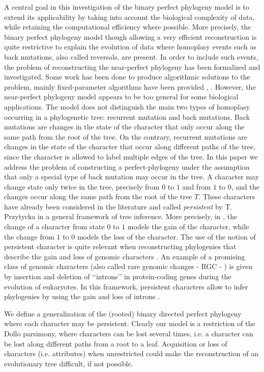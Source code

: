 \documentclass{llncs}
\begin{document}
A central goal in this investigation  of the binary perfect phylogeny model is to extend its applicability by taking into account the biological complexity of  data, while retaining  the computational efficiency where possible. More precisely, the binary perfect phylogeny model though allowing a very efficient reconstruction is quite restrictive to explain the evolution of data where   homoplasy events such as back mutations, also called reversals,  are present.  In order to include such events,   the problem of reconstructing the near-perfect phylogeny    has been formalized and investigated.  Some work has been done to produce algorithmic  solutions to the problem, mainly fixed-parameter algorithms have been provided \cite{near-perfect2}, \cite{near-perfect1}.
However,  the near-perfect phylogeny   model appears to be too general for some biological applications.  The model  does not distinguish the main two types of homoplasy occurring in a phylogenetic tree: recurrent mutation  and back mutations.    Back mutations are changes in the  state of the character that only occur along the same path from the root of the tree. On the contrary,  recurrent mutations are changes  in the  state of  the  character  that occur  along different paths of the tree, since the character is allowed to label multiple edges of the tree. In this paper we address the problem of constructing a perfect-phylogeny under the assumption that  only a special type of back mutation  may occur in the tree. A character may change state only twice in the tree,  precisely from $0$ to $1$ and from $1$ to $0$,  and the changes occur along the same path from the root of the tree $T$. These characters have  already been considered in the literature  and called {\em persistent}  by T. Przytycka \cite{Pr06} in a general framework of tree inference.  More precisely,  in  \cite{Pr06},  the change of a character from state $0$ to $1$ models the gain of  the character, while the change from $1$ to $0$ models the loss of the character.  
The use of the notion of persistent character is quite relevant when reconstructing phylogenies that describe the gain and loss of genomic characters \cite{zeng}.  An example of a promising class of genomic characters (also called rare genomic changes - RGC - ) is given by  insertion and deletion  of ‘‘introns’’ in protein-coding genes during the evolution of eukaryotes. In this framework,   persistent characters allow to infer phylogenies by using the gain and loss of introns \cite{zeng}. 

We define a generalization of the (rooted) binary directed perfect phylogeny  where each character may be persistent.   Clearly our model is a restriction of the Dollo parsimony,  where characters can be lost several times, i.e. a character can be lost along different paths from a root to a leaf. Acquisition or loss of characters (i.e. attributes) when
unrestricted could make  the reconstruction of an  evolutionary tree difficult, if not possible.
\end{document}
